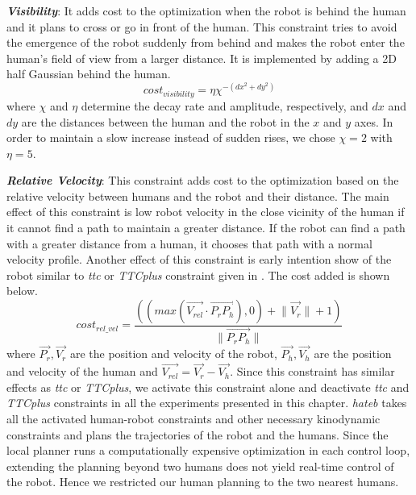 \textit{\textbf{Visibility}}: It adds cost to the optimization when the robot is behind the human and it plans to cross or go in front of the human. This constraint tries to avoid the emergence of the robot suddenly from behind and makes the robot enter the human's field of view from a larger distance. It is implemented by adding a 2D half Gaussian behind the human.
\begin{equation}
    cost_{visibility} = \eta\chi ^{-(dx^2+dy^2)}
\end{equation}
where $\chi$ and $\eta$ determine the decay rate and amplitude, respectively, and $dx$ and $dy$ are the distances between the human and the robot in the $x$ and $y$ axes. In order to maintain a slow increase instead of sudden rises, we chose $\chi = 2$ with $\eta = 5$. 

\textit{\textbf{Relative Velocity}}: This constraint adds cost to the optimization based on the relative velocity between humans and the robot and their distance. The main effect of this constraint is low robot velocity in the close vicinity \cite{kruse2014evaluating} of the human if it cannot find a path to maintain a greater distance. If the robot can find a path with a greater distance from a human, it chooses that path with a normal velocity profile. Another effect of this constraint is early intention show of the robot similar to \textit{\acrshort{ttc}} or \textit{TTCplus} constraint given in \cite{khambhaita2017viewing,singamaneni2020hateb}. The cost added is shown below.
\begin{equation}
    cost_{rel\_vel}=\frac{((max(\overrightarrow{V_{rel}}\cdot\overrightarrow{P_r P_h}),0) + \lVert\overrightarrow{V_r}\rVert + 1)}{\lVert\overrightarrow{P_r P_h}\rVert}
\end{equation}
where $\overrightarrow{P_r},\overrightarrow{V_r}$ are the position and velocity of the robot, $\overrightarrow{P_h},\overrightarrow{V_h}$ are the position and velocity of the human and $\overrightarrow{V_{rel}} = \overrightarrow{V_r}-\overrightarrow{V_h}$. Since this constraint has similar effects as \textit{\acrshort{ttc}} or \textit{TTCplus}, we activate this constraint alone and deactivate \textit{\acrshort{ttc}} and \textit{TTCplus} constraints in all the experiments presented in this chapter. \textit{\acrshort{hateb}} takes all the activated human-robot constraints and other necessary kinodynamic constraints and plans the trajectories of the robot and the humans. Since the local planner runs a computationally expensive optimization in each control loop, extending the planning beyond two humans does not yield real-time control of the robot. Hence we restricted our human planning to the two nearest humans. 

